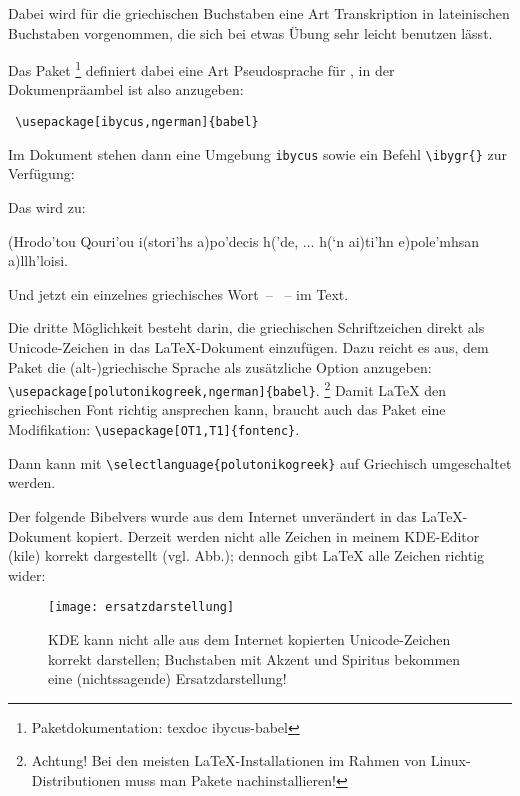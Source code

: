 Dabei wird für die griechischen Buchstaben eine Art Transkription in lateinischen Buchstaben
vorgenommen, die sich bei etwas Übung sehr leicht benutzen lässt.

Das Paket %
\footnote{Paketdokumentation: texdoc ibycus-babel}
definiert dabei eine Art Pseudosprache für ,
in der Dokumenpräambel ist also anzugeben:

\begin{lstlisting}
 \usepackage[ibycus,ngerman]{babel}
\end{lstlisting}

Im Dokument stehen dann eine Umgebung \lstinline/ibycus/ sowie ein Befehl \lstinline/\ibygr{}/
zur Verfügung:


Das wird zu:

 \begin{ibycus}
  (Hrodo'tou Qouri’ou i(stori’hs a)po’decis h(’de,
  ...
  h(‘n ai)ti’hn e)pole’mhsan a)llh’loisi. 
  \end{ibycus}

  Und jetzt ein einzelnes griechisches Wort~-- ~-- im Text.






Die dritte Möglichkeit besteht darin, die griechischen Schriftzeichen direkt als Unicode-Zeichen
in das \LaTeX -Dokument einzufügen. Dazu reicht es aus, dem Paket  die 
(alt-)griechische Sprache als zusätzliche Option anzugeben: 
\lstinline/\usepackage[polutonikogreek,ngerman]{babel}/.
\footnote{Achtung! Bei den meisten \LaTeX -Installationen im Rahmen von Linux-Distributionen muss
man Pakete nachinstallieren!}
Damit \LaTeX{} den griechischen Font richtig ansprechen kann, braucht auch das Paket  
eine Modifikation: \lstinline/\usepackage[OT1,T1]{fontenc}/.

Dann kann mit \lstinline/\selectlanguage{polutonikogreek}/ auf Griechisch umgeschaltet werden.

Der folgende Bibelvers wurde aus dem Internet unverändert in das \LaTeX -Dokument
kopiert. Derzeit werden nicht alle Zeichen in meinem KDE-Editor (kile) korrekt dargestellt (vgl. Abb.);
dennoch gibt \LaTeX{} alle Zeichen richtig wider:

\begin{figure}
 \texttt{[image: ersatzdarstellung]}
 \caption{KDE kann nicht alle aus dem Internet kopierten Unicode-Zeichen korrekt darstellen;
 Buchstaben mit Akzent und Spiritus bekommen eine (nichtssagende) Ersatzdarstellung!}
\end{figure}


